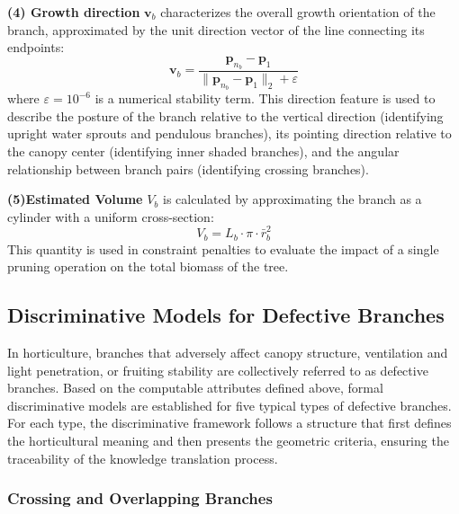 \documentclass[12pt,a4paper,fontset=fandol]{ctexart}
\newcommand{\vb}[1][b]{\mathbf{v}_{#1}}
\newcommand{\rb}{\bar{r}_b}
\begin{document}
\textbf{(4) Growth direction} $\vb$ characterizes the overall growth orientation of the branch, approximated by the unit direction vector of the line connecting its endpoints:
\begin{equation}\label{eq:direction}
  \vb = \frac{\mathbf{p}_{n_b} - \mathbf{p}_1}{\|\mathbf{p}_{n_b} - \mathbf{p}_1\|_2 + \varepsilon}
\end{equation}
where $\varepsilon = 10^{-6}$ is a numerical stability term.
This direction feature is used to describe the posture of the branch relative to the vertical direction (identifying upright water sprouts and pendulous branches), its pointing direction relative to the canopy center (identifying inner shaded branches), and the angular relationship between branch pairs (identifying crossing branches).

\textbf{(5)Estimated Volume} $V_b$ is calculated by approximating the branch as a cylinder with a uniform cross-section:
\begin{equation}\label{eq:volume}
  V_b = L_b \cdot \pi \cdot \rb^2
\end{equation}
This quantity is used in constraint penalties to evaluate the impact of a single pruning operation on the total biomass of the tree.


\subsection{Discriminative Models for Defective Branches}\label{sec:formalization:bad_branches}

In horticulture, branches that adversely affect canopy structure, ventilation and light penetration, or fruiting stability are collectively referred to as defective branches. Based on the computable attributes defined above, formal discriminative models are established for five typical types of defective branches. For each type, the discriminative framework follows a structure that first defines the horticultural meaning and then presents the geometric criteria, ensuring the traceability of the knowledge translation process.

\subsubsection{Crossing and Overlapping Branches}
\end{document}
